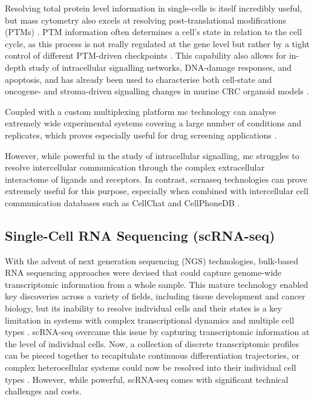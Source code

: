 Resolving total protein level information in single-cells is itself incredibly useful, but mass cytometry also excels at resolving post-translational modifications (PTMs) \cite{ochoa_functional_2019}. PTM information often determines a cell's state in relation to the cell cycle, as this process is not really regulated at the gene level but rather by a tight control of different PTM-driven checkpoints \cite{cuijpers_guiding_2018}. This capability also allows for in-depth study of intracellular signalling networks, DNA-damage responses, and apoptosis, and has already been used to characterise both cell-state and oncogene- and stroma-driven signalling changes in murine CRC organoid models \cite{qin_cell-type-specific_2020}.

Coupled with a custom multiplexing platform \cite{sufi_multiplexed_2021} \acrshort{mc} technology can analyse extremely wide experimental systems covering a large number of conditions and replicates, which proves especially useful for drug screening applications \cite{zapatero_trellis_2023}.

However, while powerful in the study of intracellular signalling, \acrlong{mc} struggles to resolve intercellular communication through the complex extracellular interactome of ligands and receptors. In contrast, \acrfull{scrnaseq} technologies can prove extremely useful for this purpose, especially when combined with intercellular cell communication databases such as CellChat \cite{jin_inference_2021} and CellPhoneDB \cite{efremova_cellphonedb_2020}.


\subsection{Single-Cell RNA Sequencing (scRNA-seq)}

With the advent of next generation sequencing (NGS) technologies, bulk-based RNA sequencing approaches were devised that could capture genome-wide transcriptomic information from a whole sample. This mature technology enabled key discoveries across a variety of fields, including tissue development and cancer biology, but its inability to resolve individual cells and their states is a key limitation in systems with complex transcriptional dynamics and multiple cell types \cite{li_bulk_2021}.
scRNA-seq overcame this issue by capturing transcriptomic information at the level of individual cells. Now, a collection of discrete transcriptomic profiles can be pieced together to recapitulate continuous differentiation trajectories, or complex heterocellular systems could now be resolved into their individual cell types \cite{haber_single-cell_2017}. However, while powerful, scRNA-seq comes with significant technical challenges and costs. 

